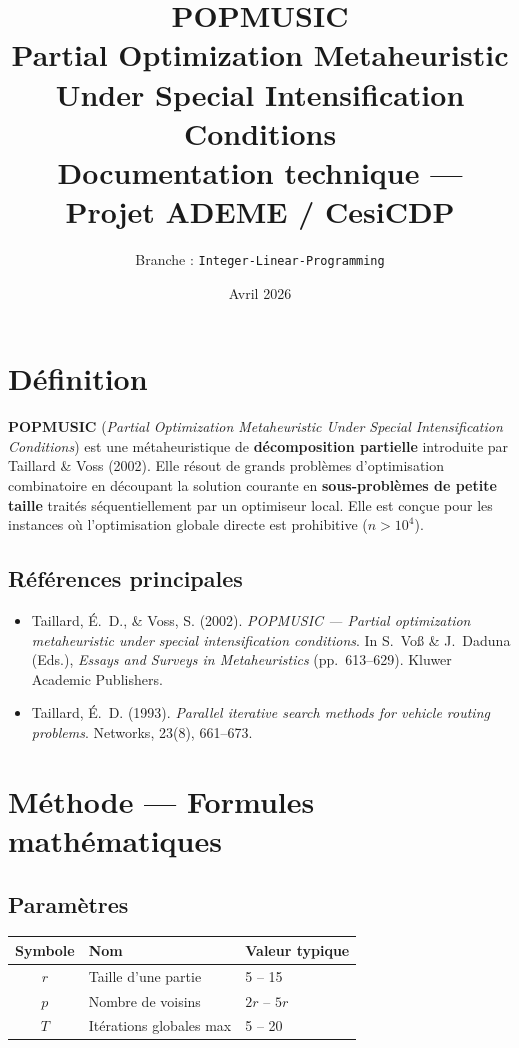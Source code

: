 \documentclass[11pt,a4paper]{article}
\title{%
  \textbf{POPMUSIC}\\
  \large Partial Optimization Metaheuristic Under Special Intensification Conditions\\[6pt]
  \normalsize Documentation technique --- Projet ADEME / CesiCDP
}
\author{Branche : \texttt{Integer-Linear-Programming}}
\date{Avril 2026}
\begin{document}
\maketitle
\thispagestyle{fancy}

\tableofcontents
\newpage

\section{Définition}

\textbf{POPMUSIC} (\textit{Partial Optimization Metaheuristic Under Special
Intensification Conditions}) est une métaheuristique de \textbf{décomposition
partielle} introduite par Taillard \& Voss (2002). Elle résout de grands
problèmes d'optimisation combinatoire en découpant la solution courante en
\textbf{sous-problèmes de petite taille} traités séquentiellement par un
optimiseur local. Elle est conçue pour les instances où l'optimisation globale
directe est prohibitive ($n > 10^4$).

\subsection*{Références principales}

\begin{itemize}
  \item Taillard, É.~D., \& Voss, S. (2002). \textit{POPMUSIC --- Partial
    optimization metaheuristic under special intensification conditions}. In
    S.~Voß \& J.~Daduna (Eds.), \textit{Essays and Surveys in Metaheuristics}
    (pp.~613--629). Kluwer Academic Publishers.
  \item Taillard, É.~D. (1993). \textit{Parallel iterative search methods for
    vehicle routing problems}. Networks, 23(8), 661--673.
\end{itemize}

\section{Méthode --- Formules mathématiques}

\subsection{Paramètres}

\begin{center}
\begin{tabular}{cll}
  \toprule
  Symbole & Nom & Valeur typique \\
  \midrule
  $r$ & Taille d'une partie & 5 -- 15 \\
  $p$ & Nombre de voisins   & $2r$ -- $5r$ \\
  $T$ & Itérations globales max & 5 -- 20 \\
  \bottomrule
\end{tabular}
\end{center}
\end{document}
